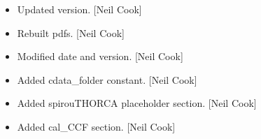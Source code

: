 \documentclass[a4paper,10pt,english]{report}
\begin{document}
\begin{itemize}
\item {} 
Updated version. {[}Neil Cook{]}

\item {} 
Rebuilt pdfs. {[}Neil Cook{]}

\item {} 
Modified date and version. {[}Neil Cook{]}

\item {} 
Added cdata\_folder constant. {[}Neil Cook{]}

\item {} 
Added spirouTHORCA placeholder section. {[}Neil Cook{]}

\item {} 
Added cal\_CCF section. {[}Neil Cook{]}

\end{itemize}
\end{document}
